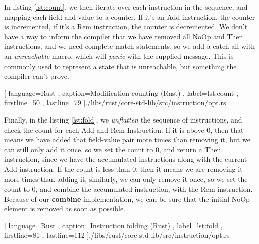 In listing \ref{lst:count}, we then iterate over each instruction in the
sequence, and mapping each field and value to a counter. If it's an Add
instruction, the counter is incremented, if it's a Rem instruction, the counter
is decremented. We don't have a way to inform the compiler that we have removed
all NoOp and Then instructions, and we need complete match-statements, so we add
a catch-all with an \textit{unreachable} macro, which will \textit{panic} with
the supplied message. This is commonly used to represent a state that is
unreachable, but something the compiler can't prove.

\begin{code}[H]
  
   [ language=Rust
   , caption={Modification counting (Rust)}
   , label=lst:count
   , firstline=50
   , lastline=79
   ]{./libs/rust/core-std-lib/src/instruction/opt.rs}
\end{code}

Finally, in the listing \ref{lst:fold}, we \textit{unflatten} the sequence of
instructions, and check the count for each Add and Rem Instruction. If it is
above $0$, then that means we have added that field-value pair more times than
removing it, but we can still only add it once, so we set the count to $0$, and
return a Then instruction, since we have the accumulated instructions along with
the current Add instruction. If the count is less than $0$, then it means we are
removing it more times than adding it, similarly, we can only remove it once, so
we set the count to $0$, and combine the accumulated instruction, with the Rem
instruction. Because of our \textbf{combine} implementation, we can be sure that
the initial NoOp element is removed as soon as possible.

\begin{code}[H]
  
   [ language=Rust
   , caption={Instruction folding (Rust)}
   , label=lst:fold
   , firstline=81
   , lastline=112
   ]{./libs/rust/core-std-lib/src/instruction/opt.rs}
\end{code}
